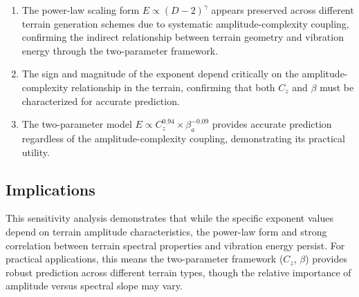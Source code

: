 \documentclass[11pt]{article}
\begin{document}
\begin{enumerate}
\item The power-law scaling form $E \propto (D-2)^\gamma$ appears preserved across different terrain generation schemes due to systematic amplitude-complexity coupling, confirming the indirect relationship between terrain geometry and vibration energy through the two-parameter framework.

\item The sign and magnitude of the exponent depend critically on the amplitude-complexity relationship in the terrain, confirming that both $C_z$ and $\beta$ must be characterized for accurate prediction.

\item The two-parameter model $E \propto C_z^{0.94} \times \beta_a^{-0.09}$ provides accurate prediction regardless of the amplitude-complexity coupling, demonstrating its practical utility.
\end{enumerate}

\subsection{Implications}

This sensitivity analysis demonstrates that while the specific exponent values depend on terrain amplitude characteristics, the power-law form and strong correlation between terrain spectral properties and vibration energy persist. For practical applications, this means the two-parameter framework ($C_z$, $\beta$) provides robust prediction across different terrain types, though the relative importance of amplitude versus spectral slope may vary.
\end{document}
